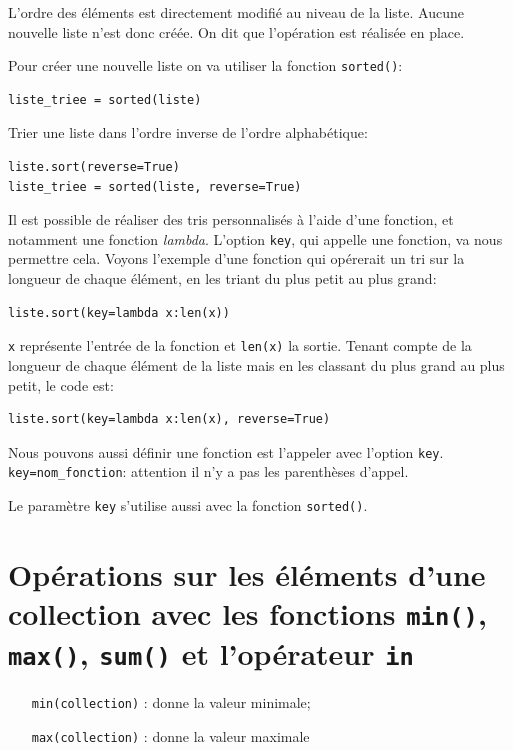 \documentclass[a4paper,11pt]{book}
\begin{document}
L'ordre des éléments est directement modifié au niveau de la liste. Aucune nouvelle liste n'est donc créée. On dit que l'opération est réalisée \og en place\fg{}.
\medskip

Pour créer une nouvelle liste on va utiliser la fonction \texttt{sorted()}:
\begin{lstlisting}
liste_triee = sorted(liste)
\end{lstlisting}
\medskip

Trier une liste dans l'ordre inverse de l'ordre alphabétique:
\begin{lstlisting}
liste.sort(reverse=True)
liste_triee = sorted(liste, reverse=True)
\end{lstlisting}
\medskip

Il est possible de réaliser des tris personnalisés à l'aide d'une fonction, et notamment une fonction \textit{lambda}. L'option \texttt{key}, qui appelle une fonction, va nous permettre cela. Voyons l'exemple d'une fonction qui opérerait un tri sur la longueur de chaque élément, en les triant du plus petit au plus grand:
\begin{lstlisting}
liste.sort(key=lambda x:len(x))
\end{lstlisting}
\medskip

\texttt{x} représente l'entrée de la fonction et \texttt{len(x)} la sortie. Tenant compte de la longueur de chaque élément de la liste mais en les classant du plus grand au plus petit, le code est:
\begin{lstlisting}
liste.sort(key=lambda x:len(x), reverse=True)
\end{lstlisting}
\medskip

Nous pouvons aussi définir une fonction est l'appeler avec l'option \texttt{key}. \texttt{key=nom\_fonction}: attention il n'y a pas les parenthèses d'appel.
\medskip

Le paramètre \texttt{key} s'utilise aussi avec la fonction \texttt{sorted()}.
\medskip

\section{Opérations sur les éléments d'une collection avec les fonctions \texttt{min()}, \texttt{max()}, \texttt{sum()} et l'opérateur \texttt{in}}
\begin{itemize}
	\item[\texttt{min(collection)}]: donne la valeur minimale;
	\item[\texttt{max(collection)}]: donne la valeur maximale
\end{itemize}
\medskip
\end{document}
